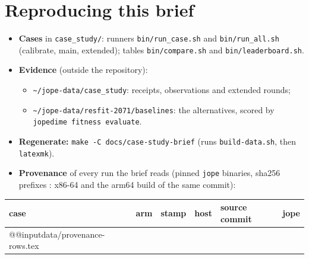 \documentclass[10.5pt]{article}
\begin{document}
\section*{Reproducing this brief}
\small\sloppy
\begin{itemize}
\item \textbf{Cases} in \texttt{case\_study/}: runners \texttt{bin/run\_case.sh} and \texttt{bin/run\_all.sh} (calibrate, main, extended); tables \texttt{bin/compare.sh} and \texttt{bin/leaderboard.sh}.
\item \textbf{Evidence} (outside the repository):
  \begin{itemize}
  \item \texttt{\textasciitilde/jope-data/case\_study}: receipts, observations and extended rounds;
  \item \texttt{\textasciitilde/jope-data/resfit-2071/baselines}: the alternatives, scored by \texttt{jopedime fitness evaluate}.
  \end{itemize}
\item \textbf{Regenerate:} \texttt{make -C docs/case-study-brief} (runs \texttt{build-data.sh}, then \texttt{latexmk}).
\item \textbf{Provenance} of every run the brief reads (pinned \texttt{jope} binaries, sha256 prefixes \texttt{\BriefJopeSha}: x86-64 and the arm64 build of the same commit):
\end{itemize}
\begin{center}\scriptsize
\begin{longtable}{@{}llll>{\raggedright\arraybackslash}p{4.4cm}l@{}}
\toprule case & arm & stamp & host & source commit & jope \\\midrule\endhead
\csname @@input\endcsname data/provenance-rows.tex
\bottomrule
\end{longtable}
\end{center}
\end{document}
